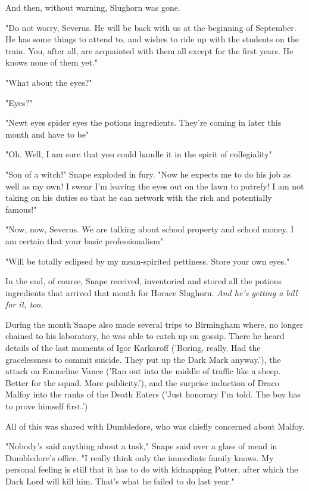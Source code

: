 And then, without warning, Slughorn was gone.

"Do not worry, Severus. He will be back with us at the beginning of September. He has some things to attend to, and wishes to ride up with the students on the train. You, after all, are acquainted with them all except for the first years. He knows none of them yet."

"What about the eyes?"

"Eyes?"

"Newt eyes{\el} spider eyes{\el} the potions ingredients. They're coming in later this month and have to be{\el}"

"Oh. Well, I am sure that you could handle it{\el} in the spirit of collegiality{\el}"

"Son of a witch!" Snape exploded in fury. "Now he expects me to do his job as well as my own! I swear I'm leaving the eyes out on the lawn to putrefy! I am not taking on his duties so that he can network with the rich and potentially famous!"

"Now, now, Severus. We are talking about school property and school money. I am certain that your basic professionalism{\el}"

"Will be totally eclipsed by my mean-spirited pettiness. Store your own eyes."

In the end, of course, Snape received, inventoried and stored all the potions ingredients that arrived that month for Horace Slughorn. \emph{And he's getting a bill for it, too.}

During the month Snape also made several trips to Birmingham where, no longer chained to his laboratory, he was able to catch up on gossip. There he heard details of the last moments of Igor Karkaroff ('Boring, really. Had the gracelessness to commit suicide. They put up the Dark Mark anyway.'), the attack on Emmeline Vance ('Ran out into the middle of traffic like a sheep. Better for the squad. More publicity.'), and the surprise induction of Draco Malfoy into the ranks of the Death Eaters ('Just honorary I'm told. The boy has to prove himself first.')

All of this was shared with Dumbledore, who was chiefly concerned about Malfoy.

"Nobody's said anything about a task," Snape said over a glass of mead in Dumbledore's office. "I really think only the immediate family knows. My personal feeling is still that it has to do with kidnapping Potter, after which the Dark Lord will kill him. That's what he failed to do last year."

